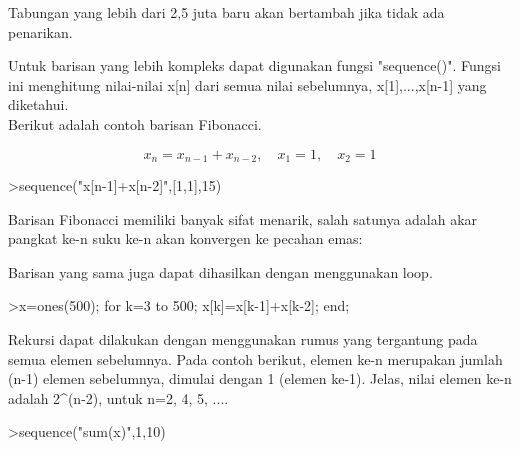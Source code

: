 \documentclass[a4paper,10pt]{article}
\begin{document}
\begin{eulernotebook}
\begin{eulercomment}
\begin{eulercomment}
\begin{eulercomment}
\begin{eulercomment}
\begin{eulercomment}
\begin{eulercomment}
\begin{eulercomment}
\begin{eulercomment}
\begin{eulercomment}
\begin{eulercomment}
\begin{eulercomment}
\begin{eulercomment}
\begin{eulercomment}
\begin{eulercomment}
\begin{eulercomment}
\begin{eulercomment}
\begin{eulercomment}
\begin{eulercomment}
\begin{eulercomment}
\begin{eulercomment}
\begin{eulercomment}
\begin{eulercomment}
\begin{eulercomment}
Tabungan yang lebih dari 2,5 juta baru akan bertambah jika tidak ada
penarikan.

Untuk barisan yang lebih kompleks dapat digunakan fungsi "sequence()".
Fungsi ini menghitung nilai-nilai x[n] dari semua nilai sebelumnya,
x[1],...,x[n-1] yang diketahui.\\
Berikut adalah contoh barisan Fibonacci.

\end{eulercomment}
\begin{eulerformula}
\[
x_n = x_{n-1}+x_{n-2}, \quad x_1=1, \quad x_2 =1
\]
\end{eulerformula}
\begin{eulerprompt}
>sequence("x[n-1]+x[n-2]",[1,1],15)
\end{eulerprompt}
\begin{euleroutput}
  [1,  1,  2,  3,  5,  8,  13,  21,  34,  55,  89,  144,  233,  377,  610]
\end{euleroutput}
\begin{eulercomment}
Barisan Fibonacci memiliki banyak sifat menarik, salah satunya adalah akar pangkat ke-n suku
ke-n akan konvergen ke pecahan emas:
\end{eulercomment}
\begin{eulercomment}
Barisan yang sama juga dapat dihasilkan dengan menggunakan loop.
\end{eulercomment}
\begin{eulerprompt}
>x=ones(500); for k=3 to 500; x[k]=x[k-1]+x[k-2]; end;
\end{eulerprompt}
\begin{eulercomment}
Rekursi dapat dilakukan dengan menggunakan rumus yang tergantung pada semua elemen
sebelumnya. Pada contoh berikut, elemen ke-n merupakan jumlah (n-1) elemen sebelumnya,
dimulai dengan 1 (elemen ke-1). Jelas, nilai elemen ke-n adalah 2\textasciicircum{}(n-2), untuk n=2, 4, 5,
....
\end{eulercomment}
\begin{eulerprompt}
>sequence("sum(x)",1,10)
\end{eulerprompt}
\begin{euleroutput}

\end{euleroutput}
\end{eulercomment}
\end{eulercomment}
\end{eulercomment}
\end{eulercomment}
\end{eulercomment}
\end{eulercomment}
\end{eulercomment}
\end{eulercomment}
\end{eulercomment}
\end{eulercomment}
\end{eulercomment}
\end{eulercomment}
\end{eulercomment}
\end{eulercomment}
\end{eulercomment}
\end{eulercomment}
\end{eulercomment}
\end{eulercomment}
\end{eulercomment}
\end{eulercomment}
\end{eulercomment}
\end{eulercomment}
\end{eulernotebook}
\end{document}
